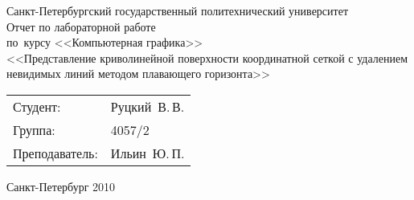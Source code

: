 
\begin{titlepage} %

\begin{center} %

\large Санкт-Петербургский государственный политехнический университет\\[4.5cm]

\huge Отчет по лабораторной работе \\[0.6cm] %
\large по~курсу <<Компьютерная графика>>\\[1cm]
\large <<Представление криволинейной поверхности координатной сеткой 
с удалением невидимых линий методом плавающего горизонта>>\\[3.7cm]

\begin{flushright} %
\begin{tabular}{l l}
Студент: & Руцкий~В.\,В.\\
Группа: & 4057/2\\
Преподаватель: & Ильин~Ю.\,П.
\end{tabular}
\end{flushright} %

\vfill %

{\large Санкт-Петербург 2010}
\end{center} %
\thispagestyle{empty} %
\end{titlepage} %
